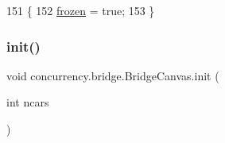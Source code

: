 \begin{DoxyCode}
151                                      \{
152         \mbox{\hyperlink{classconcurrency_1_1bridge_1_1_bridge_canvas_a1f2ccdf0586d82761c1c372e24643c0e}{frozen}} = \textcolor{keyword}{true};
153     \}
\end{DoxyCode}
\mbox{\label{classconcurrency_1_1bridge_1_1_bridge_canvas_abe6fd58a5a831f80fd3716103cc12672}} 
\subsubsection{\texorpdfstring{init()}{init()}}
{\footnotesize\ttfamily void concurrency.\+bridge.\+Bridge\+Canvas.\+init (\begin{DoxyParamCaption}\item[{int}]{ncars }\end{DoxyParamCaption})\hspace{0.3cm}{\ttfamily [inline]}}


